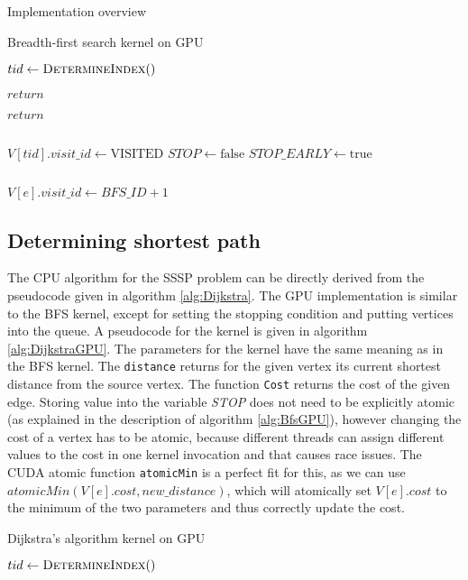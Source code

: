 \documentclass[a4paper,12pt,notitlepage,oneside]{article}
\begin{document}
\begin{section}{Implementation overview}
\begin{algorithm}
\caption{Breadth-first search kernel on GPU}\label{alg:BfsGPU}
\begin{algorithmic}[1]
	\State $tid\gets \Call{DetermineIndex}$
	
		\State $return$
	\EndIf

		\State $return$
	\EndIf

	\State $ $

	\State $V[tid].visit\_id\gets \text{VISITED}$
	\State $STOP\gets \text{false}$
		\State $STOP\_EARLY\gets \text{true}$
	\EndIf
	
	\State $ $
	
			\State $V[e].visit\_id\gets BFS\_ID + 1$
		\EndIf
	\EndFor
\EndProcedure
\end{algorithmic}
\end{algorithm}

\subsection{Determining shortest path}
	The CPU algorithm for the SSSP problem can be directly derived from the pseudocode given in algorithm \ref{alg:Dijkstra}.
	The GPU implementation is similar to the BFS kernel, except for setting the stopping condition and putting vertices into the queue.
	A pseudocode for the kernel is given in algorithm \ref{alg:DijkstraGPU}. The parameters for the kernel have the same meaning as in the BFS kernel.
	The \texttt{distance} returns for the given vertex its current shortest distance from the source vertex. The function \texttt{Cost} returns the cost
	of the given edge. Storing value into the variable \textit{STOP} does not need to be explicitly atomic (as explained in the description of algorithm
	\ref{alg:BfsGPU}), however changing the cost of a vertex has to be atomic, because different threads can assign different values to the cost in one
	kernel invocation and that causes race issues. The CUDA atomic function \texttt{atomicMin} is a perfect fit for this, as we can use
	\(atomicMin(V[e].cost, new\_distance)\), which will atomically set \(V[e].cost\) to the minimum of the two parameters and thus correctly update the cost.
	
	\begin{algorithm}
	\caption{Dijkstra's algorithm kernel on GPU}\label{alg:BfsDijkstra}
	\begin{algorithmic}[1]
		\State $tid\gets \Call{DetermineIndex}$
		

\end{algorithmic}
\end{algorithm}
\end{section}
\end{document}
